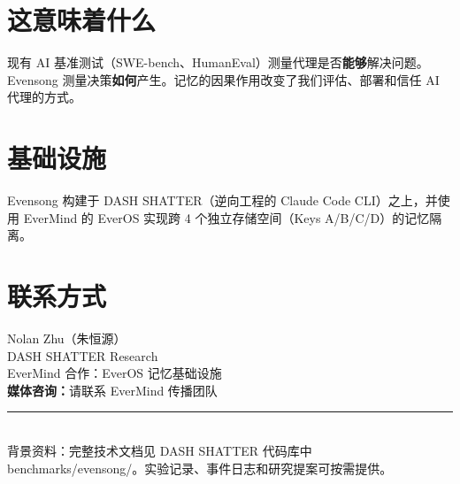 \documentclass[11pt, a4paper]{article}
\begin{document}
\section*{这意味着什么}

现有 AI 基准测试（SWE-bench、HumanEval）测量代理是否\textbf{能够}解决问题。Evensong 测量决策\textbf{如何}产生。记忆的因果作用改变了我们评估、部署和信任 AI 代理的方式。

\section*{基础设施}

Evensong 构建于 DASH SHATTER（逆向工程的 Claude Code CLI）之上，并使用 EverMind 的 EverOS 实现跨 4 个独立存储空间（Keys A/B/C/D）的记忆隔离。

\section*{联系方式}

Nolan Zhu（朱恒源）\\
DASH SHATTER Research\\
EverMind 合作：EverOS 记忆基础设施\\
\textbf{媒体咨询：}请联系 EverMind 传播团队

\vfill
{\color{accent}\rule{\textwidth}{1pt}}\\[4pt]
{\small\sffamily\color{gray}背景资料：完整技术文档见 DASH SHATTER 代码库中 benchmarks/evensong/。实验记录、事件日志和研究提案可按需提供。}
\end{document}
